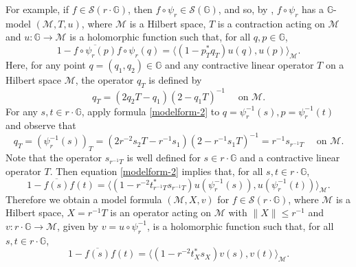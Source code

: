 \documentclass[12pt,reqno]{amsart}
\numberwithin{equation}{section}
\newcommand\inv{^{-1}}
\def\m{\mathcal{M}}
\newcommand\calm{\mathcal{M}}
\def\ip#1#2{\langle #1,#2\rangle}
\theoremstyle{definition}
\begin{document}
For example, if $f\in\mathcal{S}(r \cdot \mathbb{G})$, then $ f\circ\psi_r \in\mathcal{S}(\mathbb{G})$, and so, by \cite[Theorem 2.2]{AY17},  $ f\circ\psi_r$ has a  $\mathbb{G}$-{model}  $(\m,T,u)$, where $\calm$ is a Hilbert space, $T$ is a contraction acting on $\calm$ and $u:\mathbb{G} \to \m$ is a holomorphic function such that, for all $q,p\in \mathbb{G}$,
\begin{equation}\label{modelform-2}
 1-\overline{f\circ\psi_r (p)}f\circ\psi_r (q)= \ip{ (1-p_T^* q_T) u(q)}{u(p)}_\calm.
\end{equation}
Here, for any point $q=(q_1,q_2)\in \mathbb{G}$ and any contractive linear operator $T$ on a Hilbert space $\calm$, the operator $q_T$ is defined by
\begin{equation}\label{defsU-2}
q_T=(2q_2T-q_1)(2-q_1 T)\inv \quad \mbox{ on } \calm.
\end{equation}
For any $s,t\in r \cdot \mathbb{G}$, apply formula \eqref{modelform-2} to $ q= \psi_r^{-1} (s), p = \psi_r^{-1} (t)$ and observe that
\begin{equation}\label{defsU-3}
q_T= (\psi_r^{-1} (s))_T=(2 r^{-2} s_2 T-r^{-1}s_1)(2-r^{-1}s_1 T)\inv = r^{-1} s_{r^{-1} T}  \quad \mbox{ on } \calm.
\end{equation}
Note that the operator $s_{r^{-1} T}$ is well defined  for $s\in r \cdot \mathbb{G}$ and a contractive linear operator $T$.
Then equation  \eqref{modelform-2} implies that, for all  $s,t\in r \cdot \mathbb{G}$,
\begin{equation}\label{modelform-3}
 1-\overline{f(s)}f(t)= \ip{ (1- r^{-2}  t_{r^{-1} T}^* s_{r^{-1} T}) u(\psi_r^{-1} (s))}{u(\psi_r^{-1} (t))}_\calm.
\end{equation}
Therefore we obtain a model formula $(\m,X,v)$ for $f\in\mathcal{S}(r \cdot \mathbb{G})$, where $\calm$ is a Hilbert space, $X=r^{-1} T $ is an operator acting on $\calm$ with $\|X\| \leq r^{-1}$  and $v:r \cdot \mathbb{G} \to \m$, given by  $v = u \circ \psi_r^{-1}$, is a holomorphic function such that, for all  $s,t\in r \cdot \mathbb{G}$,
\begin{equation}\label{modelform-4}
 1-\overline{f(s)}f(t)= \ip{ (1- r^{-2}  t_{X}^* s_{X}) v(s)}{v (t)}_\calm.
\end{equation}
 
\end{document}
